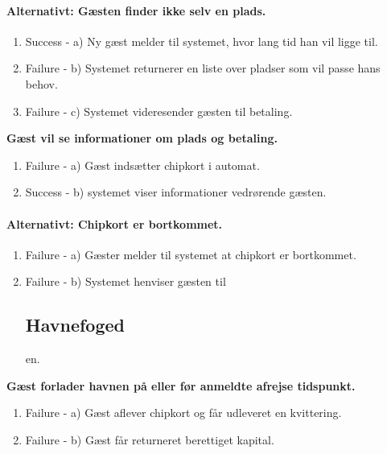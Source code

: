 {{	\paragraph{Alternativt: Gæsten finder ikke selv en plads.}
	  \begin{enumerate}
			\item Success -  a) Ny gæst melder til systemet, hvor lang tid han vil ligge til.
			\item Failure -  b) Systemet returnerer en liste over pladser som vil passe hans behov.
			\item Failure -  c) Systemet videresender gæsten til betaling.
	   \end{enumerate}

	\item{\bf{Gæst vil se informationer om plads og betaling.}
	  \begin{enumerate}
			\item Failure -  a) Gæst indsætter chipkort i automat.
			\item Success -  b) systemet viser informationer vedrørende gæsten.
	   \end{enumerate}
     
	\paragraph{Alternativt: Chipkort er bortkommet.}
	  \begin{enumerate}
			\item Failure -  a) Gæster melder til systemet at chipkort er bortkommet.
			\item Failure -  b) Systemet henviser gæsten til \subsection{Havnefoged}en.
	   \end{enumerate}
     
	\item{\bf{Gæst forlader havnen på eller før anmeldte afrejse tidspunkt.}}
	  \begin{enumerate}
			\item Failure -  a) Gæst aflever chipkort og får udleveret en kvittering.
			\item Failure -  b) Gæst får returneret berettiget kapital.
	   \end{enumerate}
    
}}}
